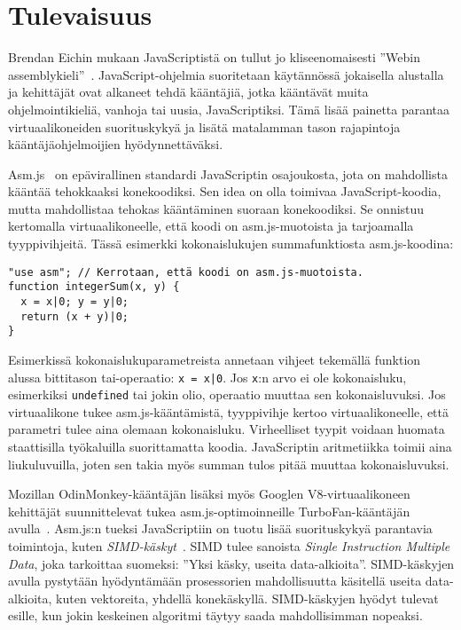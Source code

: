 \section{Tulevaisuus}

Brendan Eichin mukaan JavaScriptistä on tullut jo kliseenomaisesti ''Webin assemblykieli''~\cite{webassembly}. JavaScript-ohjelmia suoritetaan käytännössä jokaisella alustalla ja kehittäjät ovat alkaneet tehdä kääntäjiä, jotka kääntävät muita ohjelmointikieliä, vanhoja tai uusia, JavaScriptiksi. Tämä lisää painetta parantaa virtuaalikoneiden suorituskykyä ja lisätä matalamman tason rajapintoja kääntäjäohjelmoijien hyödynnettäväksi.

Asm.js~\cite{asmjs} on epävirallinen standardi JavaScriptin osajoukosta, jota on mahdollista kääntää tehokkaaksi konekoodiksi. Sen idea on olla toimivaa JavaScript-koodia, mutta mahdollistaa tehokas kääntäminen suoraan konekoodiksi. Se onnistuu kertomalla virtuaalikoneelle, että koodi on asm.js-muotoista ja tarjoamalla tyyppivihjeitä. Tässä esimerkki kokonaislukujen summafunktiosta asm.js-koodina:
\begin{lstlisting}
"use asm"; // Kerrotaan, että koodi on asm.js-muotoista.
function integerSum(x, y) {
  x = x|0; y = y|0;
  return (x + y)|0;
}
\end{lstlisting}
Esimerkissä kokonaislukuparametreista annetaan vihjeet tekemällä funktion alussa bittitason tai-operaatio: \texttt{x = x|0}. Jos \texttt{x}:n arvo ei ole kokonaisluku, esimerkiksi \texttt{undefined} tai jokin olio, operaatio muuttaa sen kokonaisluvuksi. Jos virtuaalikone tukee asm.js-kääntämistä, tyyppivihje kertoo virtuaalikoneelle, että parametri tulee aina olemaan kokonaisluku. Virheelliset tyypit voidaan huomata staattisilla työkaluilla suorittamatta koodia. JavaScriptin aritmetiikka toimii aina liukuluvuilla, joten sen takia myös summan tulos pitää muuttaa kokonaisluvuksi.

Mozillan OdinMonkey-kääntäjän lisäksi myös Googlen V8-virtuaalikoneen kehittäjät suunnittelevat tukea asm.js-optimoinneille TurboFan-kääntäjän avulla~\cite{turbofan}. Asm.js:n tueksi JavaScriptiin on tuotu lisää suorituskykyä parantavia toimintoja, kuten \textit{SIMD-käskyt}~\cite{webassembly}. SIMD tulee sanoista \textit{Single Instruction Multiple Data}, joka tarkoittaa suomeksi: ''Yksi käsky, useita data-alkioita''. SIMD-käskyjen avulla pystytään hyödyntämään prosessorien mahdollisuutta käsitellä useita data-alkioita, kuten vektoreita, yhdellä konekäskyllä. SIMD-käskyjen hyödyt tulevat esille, kun jokin keskeinen algoritmi täytyy saada mahdollisimman nopeaksi.

